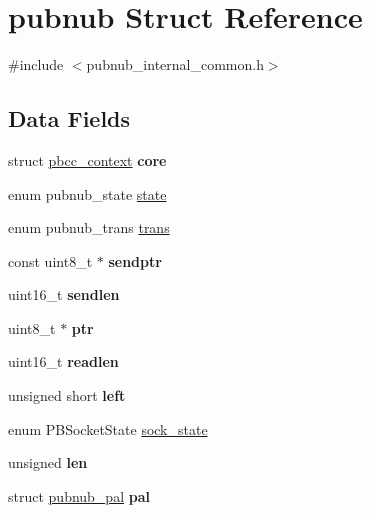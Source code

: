 \hypertarget{structpubnub}{\section{pubnub Struct Reference}
\label{structpubnub}
}


{\ttfamily \#include $<$pubnub\-\_\-internal\-\_\-common.\-h$>$}

\subsection*{Data Fields}
\begin{DoxyCompactItemize}
\item 
\hypertarget{structpubnub_ad55fffc4af13e1ad45cddb744f0a9de5}{struct \hyperlink{structpbcc__context}{pbcc\-\_\-context} {\bfseries core}}\label{structpubnub_ad55fffc4af13e1ad45cddb744f0a9de5}

\item 
enum pubnub\-\_\-state \hyperlink{structpubnub_aa17ba41d2fd001f647153b5ca7d3a437}{state}
\item 
enum pubnub\-\_\-trans \hyperlink{structpubnub_adf3f5c66118781bcfcb0f51782da3459}{trans}
\item 
\hypertarget{structpubnub_a48f894e98bf2d1cf0182e39cb358905a}{const uint8\-\_\-t $\ast$ {\bfseries sendptr}}\label{structpubnub_a48f894e98bf2d1cf0182e39cb358905a}

\item 
\hypertarget{structpubnub_a03c59e652e771a6389e3ba94fd00bd76}{uint16\-\_\-t {\bfseries sendlen}}\label{structpubnub_a03c59e652e771a6389e3ba94fd00bd76}

\item 
\hypertarget{structpubnub_acb4de00e1523c1574fd88e1576be953e}{uint8\-\_\-t $\ast$ {\bfseries ptr}}\label{structpubnub_acb4de00e1523c1574fd88e1576be953e}

\item 
\hypertarget{structpubnub_a0a10310db63969d2314b0c59c35ea3c3}{uint16\-\_\-t {\bfseries readlen}}\label{structpubnub_a0a10310db63969d2314b0c59c35ea3c3}

\item 
\hypertarget{structpubnub_aed9b7bc75ffe81aca66c705c9519c5ab}{unsigned short {\bfseries left}}\label{structpubnub_aed9b7bc75ffe81aca66c705c9519c5ab}

\item 
enum P\-B\-Socket\-State \hyperlink{structpubnub_abc73d01e757e4b049ebf04a1c298bf87}{sock\-\_\-state}
\item 
\hypertarget{structpubnub_a9d134ba94fe7f2c09d7707d41096db0f}{unsigned {\bfseries len}}\label{structpubnub_a9d134ba94fe7f2c09d7707d41096db0f}

\item 
\hypertarget{structpubnub_a70bd2be1535452988485b715bc9bb9f5}{struct \hyperlink{structpubnub__pal}{pubnub\-\_\-pal} {\bfseries pal}}\label{structpubnub_a70bd2be1535452988485b715bc9bb9f5}

\end{DoxyCompactItemize}


